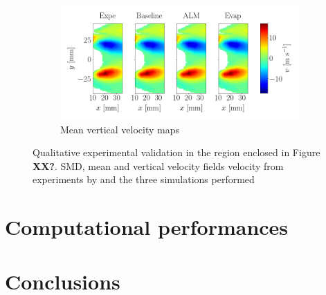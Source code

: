 \begin{figure}[h!]
\vspace*{0.1in}

\begin{subfigure}[b]{1.0\textwidth}
	\centering
	\includegraphics[scale=0.4]{./part3_applications/figures_ch9_lagrangian/simus_expe_validation/subplots_maps_vertical_velocity.png}
   \caption{Mean vertical velocity maps}
\end{subfigure}
\caption[Qualitative experimental validation]{Qualitative experimental validation in the region enclosed in Figure \textbf{XX?}. SMD, mean and vertical velocity fields velocity from experiments by  and the three simulations performed}
\label{fig:validation_BIMER_lgs}
\end{figure}

\clearpage

\section{Computational performances}

\section{Conclusions}


